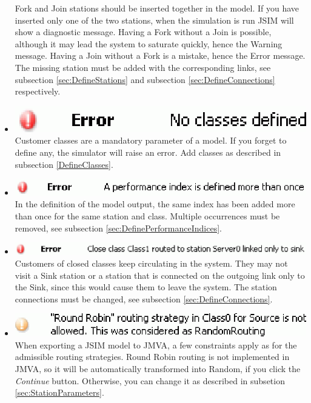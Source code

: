 \begin{itemize}
Fork and Join stations should be inserted together in the model.
If you have inserted only one of the two stations, when the
simulation is run JSIM will show a diagnostic message. Having a
Fork without a Join is possible, although it may lead the system
to saturate quickly, hence the Warning message. Having a Join
without a Fork is a mistake, hence the Error message. The missing
station must be added with the corresponding links, see subsection
\ref{sec:DefineStations} and subsection
\ref{sec:DefineConnections} respectively.
\item \includegraphics[scale=.5]{img/jsim/6.eps}\\
Customer classes are a mandatory parameter of a model. If you forget to define any, the simulator will raise an error. Add classes as described in subsection \ref{DefineClasses}.
\item \includegraphics[scale=.5]{img/jsim/10.eps}\\
In the definition of the model output, the same index has been added more than once for the same station and class. Multiple occurrences must be removed, see subsection
\autoref{sec:DefinePerformanceIndices}.
\item \includegraphics[scale=.5]{img/jsim/11.eps}\\
Customers of closed classes keep circulating in the system. They may not visit a Sink station or a station that is connected on the outgoing link only to the Sink, since this would cause them to leave the system. The station connections must be changed, see subsection \ref{sec:DefineConnections}.
\item \includegraphics[scale=.5]{img/jsim/12.eps}\\
When exporting a JSIM model to JMVA, a few constraints apply as for the admissible routing strategies. Round Robin routing is not implemented in JMVA, so it will be automatically transformed into Random, if you click the \emph{Continue} button. Otherwise, you can change it as described in subsetion \ref{sec:StationParameters}.

\end{itemize}
